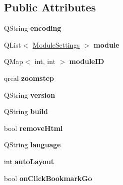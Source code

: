 \subsection*{Public Attributes}
\begin{DoxyCompactItemize}
\item 
\hypertarget{classSettings_a4ec7fb59020b63a6a5a8a9d7d671a0b0}{
QString {\bfseries encoding}}
\label{classSettings_a4ec7fb59020b63a6a5a8a9d7d671a0b0}

\item 
\hypertarget{classSettings_a5a50c0bb1e4c8fd7eea5667912414762}{
QList$<$ \hyperlink{classModuleSettings}{ModuleSettings} $>$ {\bfseries module}}
\label{classSettings_a5a50c0bb1e4c8fd7eea5667912414762}

\item 
\hypertarget{classSettings_ae79e8c9e67743a86d5c507b519f75374}{
QMap$<$ int, int $>$ {\bfseries moduleID}}
\label{classSettings_ae79e8c9e67743a86d5c507b519f75374}

\item 
\hypertarget{classSettings_a793c97945b015742072000590de3e6c6}{
qreal {\bfseries zoomstep}}
\label{classSettings_a793c97945b015742072000590de3e6c6}

\item 
\hypertarget{classSettings_a3ab3d273b2d6322505e34c68e0016b6a}{
QString {\bfseries version}}
\label{classSettings_a3ab3d273b2d6322505e34c68e0016b6a}

\item 
\hypertarget{classSettings_a222eb7c84467895c9e993b18a1b8d8ab}{
QString {\bfseries build}}
\label{classSettings_a222eb7c84467895c9e993b18a1b8d8ab}

\item 
\hypertarget{classSettings_afddb5ba4035ec3a19219377f12002b88}{
bool {\bfseries removeHtml}}
\label{classSettings_afddb5ba4035ec3a19219377f12002b88}

\item 
\hypertarget{classSettings_aefee23aee761eebf1fff9a391841b4a3}{
QString {\bfseries language}}
\label{classSettings_aefee23aee761eebf1fff9a391841b4a3}

\item 
\hypertarget{classSettings_ae0fa8315ac34a140366b405780e272c3}{
int {\bfseries autoLayout}}
\label{classSettings_ae0fa8315ac34a140366b405780e272c3}

\item 
\hypertarget{classSettings_a79f64a39105cf6f63eb8e54a64b19e83}{
bool {\bfseries onClickBookmarkGo}}
\label{classSettings_a79f64a39105cf6f63eb8e54a64b19e83}


\end{DoxyCompactItemize}
